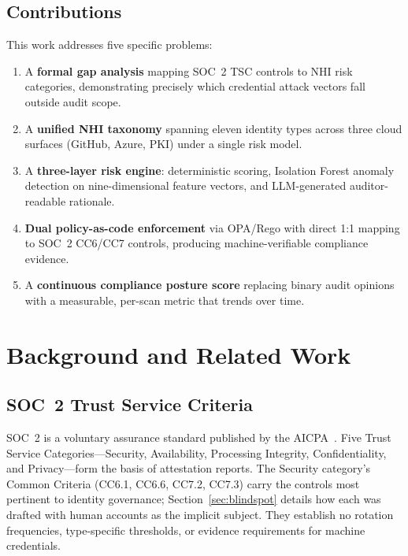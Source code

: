 \documentclass[journal]{IEEEtran}
\begin{document}
\subsection{Contributions}
\label{sec:contributions}

This work addresses five specific problems:
\begin{enumerate}
  \item A \textbf{formal gap analysis} mapping SOC~2 TSC controls to NHI risk categories, demonstrating precisely which credential attack vectors fall outside audit scope.
  \item A \textbf{unified NHI taxonomy} spanning eleven identity types across three cloud surfaces (GitHub, Azure, PKI) under a single risk model.
  \item A \textbf{three-layer risk engine}: deterministic scoring, Isolation Forest anomaly detection on nine-dimensional feature vectors, and LLM-generated auditor-readable rationale.
  \item \textbf{Dual policy-as-code enforcement} via OPA/Rego with direct 1:1 mapping to SOC~2 CC6/CC7 controls, producing machine-verifiable compliance evidence.
  \item A \textbf{continuous compliance posture score} replacing binary audit opinions with a measurable, per-scan metric that trends over time.
\end{enumerate}

\section{Background and Related Work}
\label{sec:background}

\subsection{SOC~2 Trust Service Criteria}

SOC~2 is a voluntary assurance standard published by the AICPA~\cite{aicpa2017tsc}. Five Trust Service Categories---Security, Availability, Processing Integrity, Confidentiality, and Privacy---form the basis of attestation reports. The Security category's Common Criteria (CC6.1, CC6.6, CC7.2, CC7.3) carry the controls most pertinent to identity governance; Section~\ref{sec:blindspot} details how each was drafted with human accounts as the implicit subject. They establish no rotation frequencies, type-specific thresholds, or evidence requirements for machine credentials.
\end{document}
